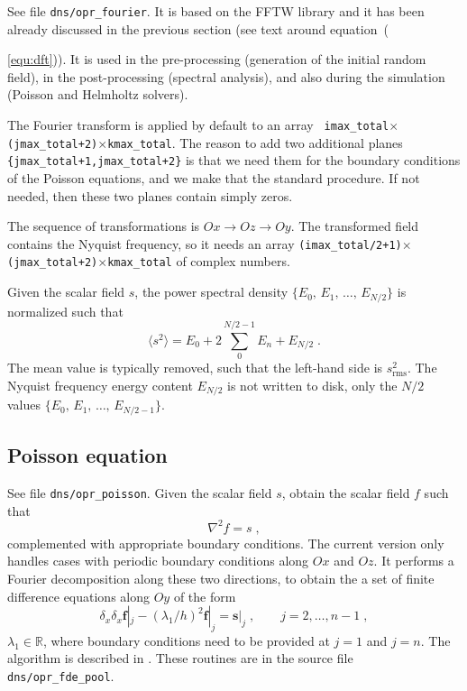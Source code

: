 See file {\tt dns/opr\_fourier}. It is based on the FFTW library and it has been
already discussed in the previous section (see text around
equation~({\ref{equ:dft})).  It is used in the pre-processing (generation of the
  initial random field), in the post-processing (spectral analysis), and also
  during the simulation (Poisson and Helmholtz solvers).

The Fourier transform is applied by default to an array {\tt
  imax\_total}$\times${\tt(jmax\_total+2)}$\times${\tt kmax\_total}. The reason
to add two additional planes {\tt \{jmax\_total+1,jmax\_total+2\}} is that we
need them for the boundary conditions of the Poisson equations, and we make that
the standard procedure. If not needed, then these two planes contain simply
zeros.

The sequence of transformations is $Ox\rightarrow Oz\rightarrow Oy$. The
transformed field contains the Nyquist frequency, so it needs an array
{\tt(imax\_total/2+1)}$\times${\tt(jmax\_total+2)}$\times${\tt kmax\_total} of
complex numbers.

Given the scalar field $s$, the power spectral density
$\{E_0,\,E_1,\,\ldots,\,E_{N/2}\}$ is normalized such that
\begin{equation}
\langle s^2\rangle = E_0+2\sum_0^{N/2-1}E_n+E_{N/2} \;.
\end{equation}
The mean value is typically removed, such that the left-hand side is
$s^2_\text{rms}$. The Nyquist frequency energy content $E_{N/2}$ is not written
to disk, only the $N/2$ values $\{E_0,\,E_1,\,\ldots,\,E_{N/2-1}\}$.

\subsection{Poisson equation}

See file {\tt dns/opr\_poisson}. Given the scalar field $s$, obtain the scalar
field $f$ such that
\begin{equation}
\nabla^2 f= s \;,
\end{equation}
complemented with appropriate boundary conditions.  The current version only
handles cases with periodic boundary conditions along $Ox$ and $Oz$. It performs
a Fourier decomposition along these two directions, to obtain the a set of
finite difference equations along $Oy$ of the form
\begin{equation}
  \delta_x \delta_x \mathbf{f}|_j - (\lambda_1/h)^2\mathbf{f}|_j=\mathbf{s}|_j 
  \;,\qquad j=2,\ldots,n-1 \;,
\end{equation}
$\lambda_1\in\mathbb{R}$, where boundary conditions need to be provided at $j=1$ and
$j=n$.  The algorithm is described in \cite{Mellado:2012}. These routines are in
the source file {\tt dns/opr\_fde\_pool}.

}
